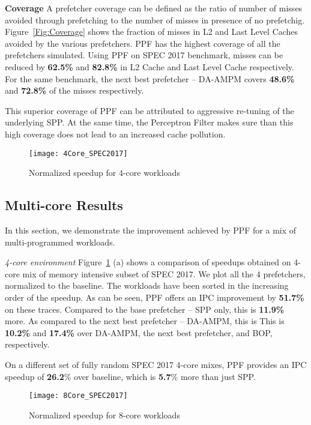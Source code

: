 \textbf{Coverage}\newline
A prefetcher coverage can be defined as the ratio of number of misses 
avoided through prefetching to the number of misses in presence of no 
prefetchig.
Figure~\ref{Fig:Coverage} shows the fraction of misses in L2 and Last
Level Caches avoided by the various prefetchers.
PPF has the highest coverage of all the prefetchers simulated. Using PPF 
on SPEC 2017 benchmark, 
misses can be reduced by \textbf{62.5\%} and \textbf{82.8\%} in L2 Cache and Last Level 
Cache respectively. For the same benchmark, the next best prefetcher -- 
DA-AMPM covers \textbf{48.6\%} and \textbf{72.8\%} of the misses respectively.

This superior coverage of PPF can be attributed to aggressive 
re-tuning of the underlying SPP. At the same time, the Perceptron Filter
makes sure than this high coverage does not lead to an increased 
cache pollution. 


\begin{figure}[h]
\texttt{[image: 4Core\_SPEC2017]}
\caption{Normalized speedup for 4-core workloads}
\label{Fig:4Core_SPEC2017}
\end{figure}


\subsection{Multi-core Results}
\label{Results-Multi}
In this section, we demonstrate the improvement achieved by PPF
for a mix of multi-programmed workloads.

\textit{4-core environment} Figure~\ref{Fig:4Core_SPEC2017} (a) 
shows a comparison of speedups
obtained on 4-core mix of memory intensive subset of SPEC 2017.  We
plot all the 4 prefetchers, normalized to the baseline.  The workloads
have been sorted in the increasing order of the speedup.
As can be seen,
PPF offers an IPC improvement by \textbf{51.7\%} on these traces.  
Compared to the base prefetcher -- SPP only, this is \textbf{11.9\%} more.
As compared to the next best prefetcher -- DA-AMPM, this is 
This is \textbf{10.2\%} and \textbf{17.4\%} over DA-AMPM, 
the next best prefetcher, and BOP, respectively.

On a different set of fully random SPEC 2017 4-core mixes, 
PPF provides an IPC speedup of 
\textbf{26.2}\% over baseline, which is \textbf{5.7}\% more than just SPP.


\begin{figure}[h]
\texttt{[image: 8Core\_SPEC2017]}
\caption{Normalized speedup for 8-core workloads}
\label{Fig:8Core_SPEC2017}
\end{figure}



